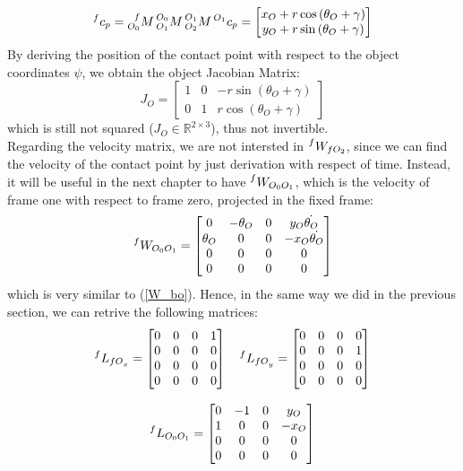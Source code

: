 \documentclass[a4paper,12pt,oneside]{report}
\begin{document}
\begin{equation}
  \prescript{f}{}{c_p}=\prescript{f}{O_0}{M}\prescript{O_0}{O_1}{M}\prescript{O_1}{O_2}{M}\prescript{O_1}{}{c_p}=\begin{bmatrix}
    x_O + r \cos{(\theta_O+\gamma)}\\
    y_O + r \sin{(\theta_O+\gamma)}
  \end{bmatrix}
\end{equation}
By deriving the position of the contact point with respect to the object coordinates $\psi$, we obtain the object Jacobian Matrix:
\begin{equation}
  J_O=\begin{bmatrix}
    1&0&-r\sin{(\theta_O+\gamma)}\\
    0&1&r\cos{(\theta_O+\gamma)}
  \end{bmatrix}
  \label{object_jacobian}
\end{equation}
which is still not squared ($J_O \in \mathbb{R}^{2 \times 3}$), thus not invertible.\\

Regarding the velocity matrix, we are not intersted in $\prescript{f}{}{W_{fO_2}}$, since we can find the velocity of the contact point by just derivation with respect of time. Instead, it will be useful in the next chapter to have $\prescript{f}{}{W_{O_0O_1}}$, which is the velocity of frame one with respect to frame zero, projected in the fixed frame:
\begin{equation}
  \prescript{f}{}{W_{O_0O_1}}=\begin{bmatrix}
    0&-\theta_O&0&y_O \dot{\theta_O}\\
    \theta_O&0&0&-x_O \dot{\theta_O}\\
    0&0&0&0\\
    0&0&0&0
  \end{bmatrix}
\end{equation}
which is very similar to (\ref{W_bo}). Hence, in the same way we did in the previous section, we can retrive the following matrices:
\begin{equation}
  \begin{array}{c}
    \prescript{f}{}{L_{{fO}_x}}=\begin{bmatrix}
      0&0&0&1\\
      0&0&0&0\\
      0&0&0&0\\
      0&0&0&0
    \end{bmatrix} \quad
    \prescript{f}{}{L_{{fO}_y}}=\begin{bmatrix}
      0&0&0&0\\
      0&0&0&1\\
      0&0&0&0\\
      0&0&0&0
    \end{bmatrix}\\ \\
    \prescript{f}{}{L_{O_0O_1}}=\begin{bmatrix}
      0&-1&0&y_O\\
      1&0&0&-x_O\\
      0&0&0&0\\
      0&0&0&0
    \end{bmatrix}
  \end{array}
\end{equation}
\end{document}
